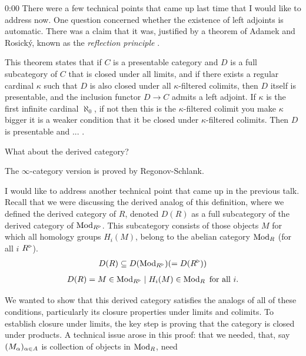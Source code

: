 \begin{unfinished}{0:00}
There were a few technical points that came up last time that I would like to address now. One question concerned whether the existence of left adjoints is automatic. There was a claim that it was, justified by a theorem of Adamek and Rosický, known as the \emph{reflection principle} . 

This theorem states that if $C$ is a presentable category and $D$ is a full subcategory of $C$ that is closed under all limits, and if there exists a regular cardinal $\kappa$ such that $D$ is also closed under all $\kappa$-filtered colimits, then $D$ itself is presentable, and the inclusion functor $D \to C$ admits a left adjoint.
If $\kappa$ is the first infinite cardinal $\aleph_0$, if not then this is the $\kappa$-filtered colimit %
you make $\kappa$ bigger it is a weaker condition that it be closed under $\kappa$-filtered colimits. Then $D$ is presentable and ... .

\ques What about the derived category?

\ans The $\infty$-category version is proved by Regonov-Schlank. 

\begin{remark}
I would like to address another technical point that came up in the previous talk. Recall that we were discussing the derived analog of this definition, where we defined the derived category of $R$, denoted $D(R)$ as a full subcategory of the derived category of $\operatorname{Mod}_{R^\triangleright}$. This subcategory consists of those objects $M$ for which all homology groups $H_i(M)$, belong to the abelian category $\operatorname{Mod}_R$ (for all $i$ $R^\triangleright$).
\begin{align*}
D(R) \subseteq D(\operatorname{Mod}_{R^\triangleright}) (= D(R^\triangleright))
\end{align*}
\begin{align*}
D(R) = { M \in \operatorname{Mod}_{R^\triangleright} \mid H_i(M) \in \operatorname{Mod}_R \text{ for all } i }.
\end{align*}
\end{remark}

We wanted to show that this derived category satisfies the analogs of all of these conditions, particularly its closure properties under limits and colimits.
To establish closure under limits, the key step is proving that the category is closed under products.
A technical issue arose in this proof: that we needed, that, say $(M_\alpha)_{\alpha \in A}$ is collection of objects in $\operatorname{Mod}_R$, need 


\end{unfinished}
